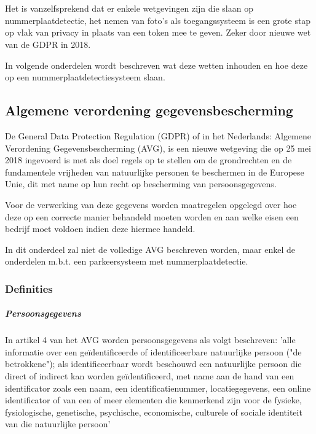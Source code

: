 
\chapter{}
\label{ch:wetgeving-nummerplaatdetectie}

Het is vanzelfsprekend dat er enkele wetgevingen zijn die slaan op nummerplaatdetectie, het nemen van foto's als toegangssysteem is een grote stap op vlak van privacy in plaats van een token mee te geven. Zeker door nieuwe wet van de GDPR in 2018.

In volgende onderdelen wordt beschreven wat deze wetten inhouden en hoe deze op een nummerplaatdetectiesysteem slaan.

\section{Algemene verordening gegevensbescherming}
De General Data Protection Regulation (GDPR) of in het Nederlands: Algemene Verordening Gegevensbescherming (AVG), is een nieuwe wetgeving die op 25 mei 2018 ingevoerd is met als doel regels op te stellen om de grondrechten en de fundamentele vrijheden van natuurlijke personen te beschermen in de Europese Unie, dit met name op hun recht op bescherming van persoonsgegevens. \autocite{avg2018privacy}

Voor de verwerking van deze gegevens worden maatregelen opgelegd over hoe deze op een correcte manier behandeld moeten worden en aan welke eisen een bedrijf moet voldoen indien deze hiermee handeld.

In dit onderdeel zal niet de volledige AVG beschreven worden, maar enkel de onderdelen m.b.t. een parkeersysteem met nummerplaatdetectie.

\subsection{Definities}

\paragraph{Persoonsgegevens}
In artikel 4 van het AVG worden persoonsgegevens als volgt beschreven: 'alle informatie over een geïdentificeerde of identificeerbare natuurlijke persoon ("de betrokkene"); als identificeerbaar wordt beschouwd een natuurlijke persoon die direct of indirect kan worden geïdentificeerd, met name aan de hand van een identificator zoals een naam, een identificatienummer, locatiegegevens, een online identificator of van een of meer elementen die kenmerkend zijn voor de fysieke, fysiologische, genetische, psychische, economische, culturele of sociale identiteit van die natuurlijke persoon' \autocite{avg2018privacy}

